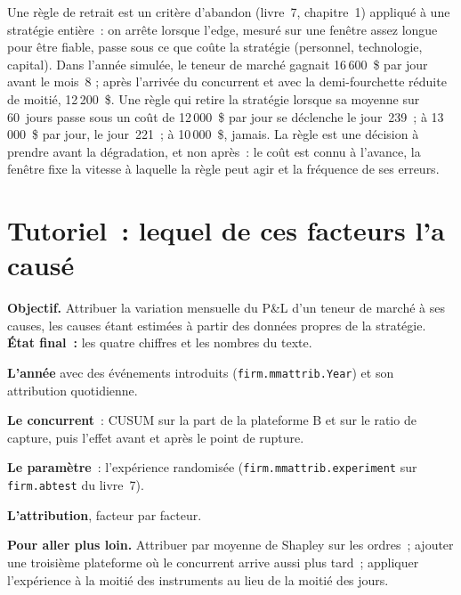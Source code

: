 Une règle de retrait est un critère d'abandon (livre~7, chapitre~1) appliqué à une stratégie entière~: on arrête lorsque l'edge, mesuré sur une fenêtre
assez longue pour être fiable, passe sous ce que coûte la stratégie (personnel, technologie, capital). Dans l'année simulée, le teneur de marché gagnait 16\,600~\$ par jour avant le mois~8
; après l'arrivée du concurrent et avec la demi-fourchette réduite de moitié, 12\,200~\$. Une règle qui retire la stratégie lorsque sa moyenne sur 60~jours passe sous un
coût de 12\,000~\$ par jour se déclenche le jour~239~; à 13\,000~\$ par jour, le jour~221~; à 10\,000~\$, jamais. La règle est une décision à prendre avant la dégradation, et non
après~: le coût est connu à l'avance, la fenêtre fixe la vitesse à laquelle la règle peut agir et la fréquence de ses erreurs.

\section{Tutoriel~: lequel de ces facteurs l'a causé}\label{tut:hf:pnl-analytics-and-the-strategy-lifecycle:tut}

\begin{tutorial}
\textbf{Objectif.} Attribuer la variation mensuelle du P\&L d'un teneur de marché à ses causes, les causes étant estimées à partir des données propres de la stratégie.
\textbf{État final~:} les quatre chiffres et les nombres du texte.
\begin{tutsteps}
\item \textbf{L'année} avec des événements introduits (\texttt{firm.mmattrib.Year}) et son attribution quotidienne.
\item \textbf{Le concurrent}~: CUSUM sur la part de la plateforme B et sur le ratio de capture, puis l'effet avant et après le point de rupture.
\item \textbf{Le paramètre}~: l'expérience randomisée (\texttt{firm.mmattrib.experiment} sur \texttt{firm.abtest} du livre~7).
\label{lst:hf:pnl-analytics-and-the-strategy-lifecycle:exp}
\item \textbf{L'attribution}, facteur par facteur.
\label{lst:hf:pnl-analytics-and-the-strategy-lifecycle:change}
\end{tutsteps}
\textbf{Pour aller plus loin.} Attribuer par moyenne de Shapley sur les ordres~; ajouter une troisième plateforme où le concurrent arrive aussi plus tard~; appliquer
l'expérience à la moitié des instruments au lieu de la moitié des jours.
\end{tutorial}

